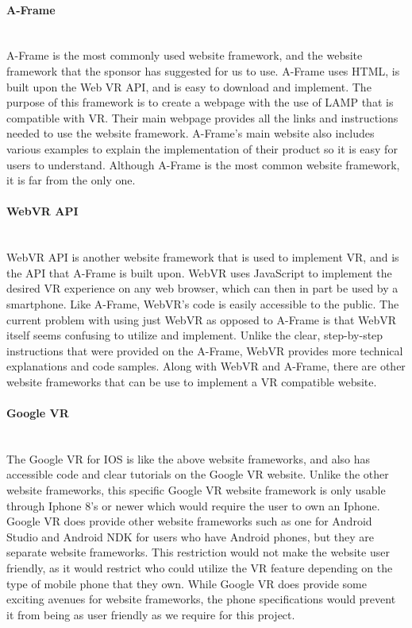 \documentclass[onecolumn, draftclsnofoot,10pt, compsoc]{IEEEtran}
\begin{document}
\paragraph{A-Frame} \\
    A-Frame is the most commonly used website framework, and the website framework that the sponsor has suggested for us to use.
    A-Frame uses HTML, is built upon the Web VR API, and is easy to download and implement.
    The purpose of this framework is to create a webpage with the use of LAMP that is compatible with VR.
    Their main webpage provides all the links and instructions needed to use the website framework. 
    A-Frame's main website also includes various examples to explain the implementation of their product so it is easy for users to understand.
    Although A-Frame is the most common website framework, it is far from the only one.
    
\paragraph{WebVR API} \\
    WebVR API is another website framework that is used to implement VR, and is the API that A-Frame is built upon.
    WebVR uses JavaScript to implement the desired VR experience on any web browser, which can then in part be used by a smartphone.
    Like A-Frame, WebVR's code is easily accessible to the public. 
    The current problem with using just WebVR as opposed to A-Frame is that WebVR itself seems confusing to utilize and implement.
    Unlike the clear, step-by-step instructions that were provided on the A-Frame, WebVR provides more technical explanations and code samples.
    Along with WebVR and A-Frame, there are other website frameworks that can be use to implement a VR compatible website. 
    
\paragraph{Google VR} \\
    The Google VR for IOS is like the above website frameworks, and also has accessible code and clear tutorials on the Google VR website.
    Unlike the other website frameworks, this specific Google VR website framework is only usable through Iphone 8's or newer which would require the user to own an Iphone.
    Google VR does provide other website frameworks such as one for Android Studio and Android NDK for users who have Android phones, but they are separate website frameworks.
    This restriction would not make the website user friendly, as it would restrict who could utilize the VR feature depending on the type of mobile phone that they own.
    While Google VR does provide some exciting avenues for website frameworks, the phone specifications would prevent it from being as user friendly as we require for this project.
\end{document}
